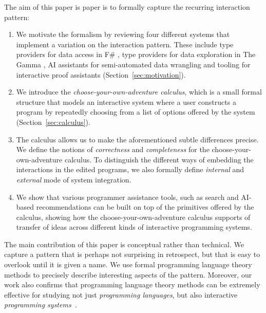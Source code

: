 \documentclass[a4paper,UKenglish,cleveref, autoref, thm-restate]{lipics-v2021}
\begin{document}
The aim of this paper is paper is to formally capture the recurring interaction pattern:

\begin{enumerate}
\setlength{\itemsep}{5pt}
\item We motivate the formalism by reviewing four different systems that implement a variation on the
interaction pattern. These include type providers for data access in F\# \cite{syme-2013-inforich},
type providers for data exploration in The Gamma \cite{petricek-2022-thegamma,petricek-2017-dotdriven},
AI assistants for semi-automated data wrangling \cite{petricek-2023-aias} and tooling for
interactive proof assistants \cite{altenkirch-1994-alf,brady-2015-idris,verter-2024-mixed} (Section~\ref{sec:motivation}).

\item We introduce the \emph{choose-your-own-adventure calculus}, which is a small formal structure
that models an interactive system where a user constructs a program by repeatedly choosing from a list
of options offered by the system (Section~\ref{sec:calculus}).

\item The calculus allows us to make the aforementioned subtle differences precise. We define the
notions of \emph{correctness} and \emph{completeness} for the choose-your-own-adventure calculus.
To distinguish the different ways of embedding the interactions in the edited programs, we
also formally define \emph{internal} and \emph{external} mode of system integration.

\item We show that various programmer assistance tools, such as search and AI-based recommendations
can be built on top of the primitives offered by the calculus, showing how the
choose-your-own-adventure calculus supports of transfer of ideas across different kinds of
interactive programming systems.
\end{enumerate}

The main contribution of this paper is conceptual rather than technical. We capture a
pattern that is perhaps not surprising in retrospect, but that is easy to overlook until it is
given a name. We use formal programming language theory methods to precisely describe
interesting aspects of the pattern. Moreover, our work also confirms that programming
language theory methods can be extremely effective for studying not just \emph{programming
languages}, but also interactive \emph{programming systems}~\cite{jakubovic-2023-techdims}.
\end{document}
